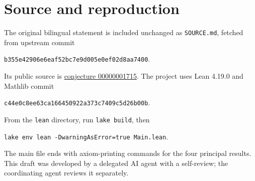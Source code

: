 \documentclass[11pt]{article}
\begin{document}
\section*{Source and reproduction}
The original bilingual statement is included unchanged as
\texttt{SOURCE.md}, fetched from upstream commit
\begin{center}\small
\texttt{b355e42906e6eaf52bc7e9d005e0ef02d8aa7400}.
\end{center}
Its public source is
\href{https://github.com/The-Last-Math-Competition/The-Last-Math-Competition/blob/b355e42906e6eaf52bc7e9d005e0ef02d8aa7400/conjectures/00000001715.md}{conjecture 00000001715}.
The project uses Lean 4.19.0 and Mathlib commit
\begin{center}\small
\texttt{c44e0c8ee63ca166450922a373c7409c5d26b00b}.
\end{center}
From the \texttt{lean} directory, run \texttt{lake build}, then
\begin{center}
\texttt{lake env lean -DwarningAsError=true Main.lean}.
\end{center}
The main file ends with axiom-printing commands for the four principal
results. This draft was developed by a delegated AI agent with a
self-review; the coordinating agent reviews it separately.
\end{document}
